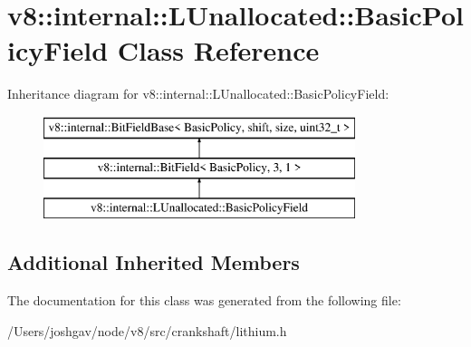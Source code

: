 \hypertarget{classv8_1_1internal_1_1_l_unallocated_1_1_basic_policy_field}{}\section{v8\+:\+:internal\+:\+:L\+Unallocated\+:\+:Basic\+Policy\+Field Class Reference}
\label{classv8_1_1internal_1_1_l_unallocated_1_1_basic_policy_field}
Inheritance diagram for v8\+:\+:internal\+:\+:L\+Unallocated\+:\+:Basic\+Policy\+Field\+:\begin{figure}[H]
\begin{center}
\leavevmode
\includegraphics[height=3.000000cm]{classv8_1_1internal_1_1_l_unallocated_1_1_basic_policy_field}
\end{center}
\end{figure}
\subsection*{Additional Inherited Members}


The documentation for this class was generated from the following file\+:\begin{DoxyCompactItemize}
\item 
/\+Users/joshgav/node/v8/src/crankshaft/lithium.\+h\end{DoxyCompactItemize}
